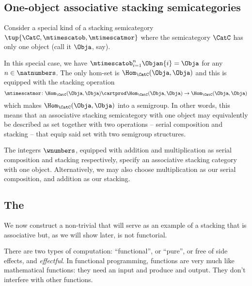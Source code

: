 %

\subsection{One-object associative stacking semicategories}

Consider a special kind of a stacking semicategory $\tup{\CatC, \mtimescatob, \mtimescatmor}$ where the semicategory $\CatC$ has only one object (call it $\Obja$, say).

In this special case, we have $\mtimescatob_{i=1}^n \Objan{i} = \Obja$ for any $n \in \natnumbers$.
The only hom-set is $\Hom_\CatC(\Obja, \Obja)$ and this is equipped with the stacking operation
\begin{equation}
    \mtimescatmor \colon \Hom_\CatC(\Obja, \Obja) \cartprod \Hom_\CatC(\Obja, \Obja) \to \Hom_\CatC(\Obja, \Obja)
\end{equation}
which makes $\Hom_\CatC(\Obja, \Obja)$ into a semigroup.
In other words, this means that an associative stacking semicategory with one object may equivalently be described as set together with two operations -- serial composition and stacking -- that equip said set with two semigroup structures.

\begin{example}
    The integers $\wnumbers$, equipped with addition and multiplication as serial composition and stacking respectively, specify an associative stacking category with one object.
    Alternatively, we may also choose multiplication as our serial composition, and addition as our stacking.
\end{example}

\subsection{The  \Effects}

We now construct a non-trivial  that will serve as an example of a stacking  that is associative but, as we will show later, is not functorial.

There are two types of computation: ``functional'', or ``pure'', or free of side effects, and \emph{effectful}.
In functional programming, functions are very much like mathematical functions: they need an input and produce and output.
They don't interfere with other functions.

